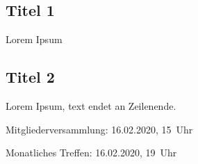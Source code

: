\subsection{Titel 1}
Lorem Ipsum

\subsection{Titel 2}
Lorem Ipsum, text endet an Zeilenende.


\begin{termine}
  \item Mitgliederversammlung: 16.02.2020, 15~Uhr
  \item Monatliches Treffen: 16.02.2020, 19~Uhr
\end{termine}
\impressum


